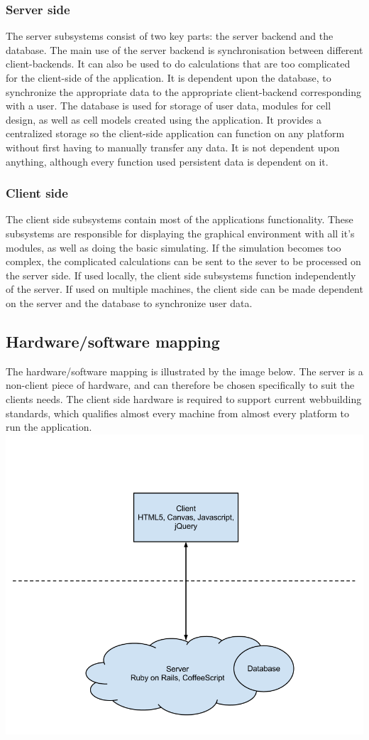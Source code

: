 \documentclass{report}
\begin{document}
			\subsubsection{Server side}
				The server subsystems consist of two key parts: the server backend and the database. The main use of the server backend is synchronisation between different client-backends. It can also be used to do calculations that are too complicated for the client-side of the application. It is dependent upon the database, to synchronize the appropriate data to the appropriate client-backend corresponding with a user.
				The database is used for storage of user data, modules for cell design, as well as cell models created using the application. It provides a centralized storage so the client-side application can function on any platform without first having to manually transfer any data. It is not dependent upon anything, although every function used persistent data is dependent on it.
			\subsubsection{Client side}
				The client side subsystems contain most of the applications functionality. These subsystems are responsible for displaying the graphical environment with all it's modules, as well as doing the basic simulating. If the simulation becomes too complex, the complicated calculations can be sent to the sever to be processed on the server side. If used locally, the client side subsystems function independently of the server. If used on multiple machines, the client side can be made dependent on the server and the database to synchronize user data.
		\subsection{Hardware/software mapping}
			The hardware/software mapping is illustrated by the image below. The server is a non-client piece of hardware, and can therefore be chosen specifically to suit the clients needs. The client side hardware is required to support current webbuilding standards, which qualifies almost every machine from almost every platform to run the application.\\
			\includegraphics[width=16cm]{EAD.png}
\end{document}
